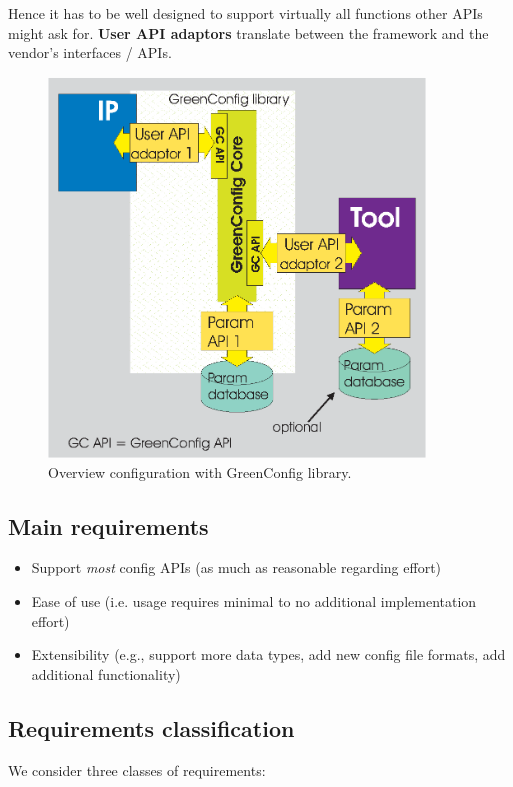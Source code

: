 Hence it has to be well designed to support virtually all functions other APIs might ask for. {\bf User API adaptors} translate between the \GreenConfig framework and the vendor's interfaces / APIs. 

\begin{figure}[H]%
	\centerline{
		\includegraphics[width=10cm]{requirements_API_overview_GreenConfig.eps}} 
	\caption{Overview configuration with GreenConfig library.}
	\label{fig:overviewGreenConfrequ}
\end{figure}



\subsection{Main requirements}
\begin{itemize}
	\item Support {\em most} config APIs (as much as reasonable regarding effort) 
	\item Ease of use (i.e. usage requires minimal to no additional implementation effort) 
	\item Extensibility (e.g., support more data types, add new config file formats, add additional functionality) 
\end{itemize}



\subsection{Requirements classification}
We consider three classes of requirements: 

